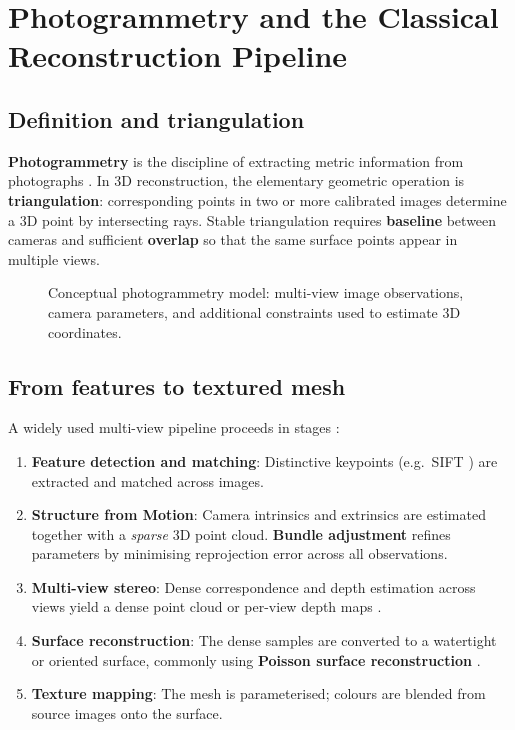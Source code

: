 \section{Photogrammetry and the Classical Reconstruction Pipeline}
\label{sec:photogrammetry}

\subsection{Definition and triangulation}

\textbf{Photogrammetry} is the discipline of extracting metric information from photographs \cite{luhmann2014photogrammetry}. In 3D reconstruction, the elementary geometric operation is \textbf{triangulation}: corresponding points in two or more calibrated images determine a 3D point by intersecting rays. Stable triangulation requires \textbf{baseline} between cameras and sufficient \textbf{overlap} so that the same surface points appear in multiple views.

\begin{figure}[htbp]
\centering
{}
\caption{Conceptual photogrammetry model: multi-view image observations, camera parameters, and additional constraints used to estimate 3D coordinates.}
\label{fig:ch2_photo_concept}
\end{figure}

\subsection{From features to textured mesh}

A widely used multi-view pipeline proceeds in stages \cite{luhmann2014photogrammetry,lowe2004sift,furukawa2010pmvs,kazhdan2006poisson}:

\begin{enumerate}
    \item \textbf{Feature detection and matching}: Distinctive keypoints (e.g.\ SIFT \cite{lowe2004sift}) are extracted and matched across images.

    \item \textbf{Structure from Motion}: Camera intrinsics and extrinsics are estimated together with a \emph{sparse} 3D point cloud. \textbf{Bundle adjustment} refines parameters by minimising reprojection error across all observations.

    \item \textbf{Multi-view stereo}: Dense correspondence and depth estimation across views yield a dense point cloud or per-view depth maps \cite{furukawa2010pmvs}.

    \item \textbf{Surface reconstruction}: The dense samples are converted to a watertight or oriented surface, commonly using \textbf{Poisson surface reconstruction} \cite{kazhdan2006poisson}.

    \item \textbf{Texture mapping}: The mesh is parameterised; colours are blended from source images onto the surface.
\end{enumerate}

